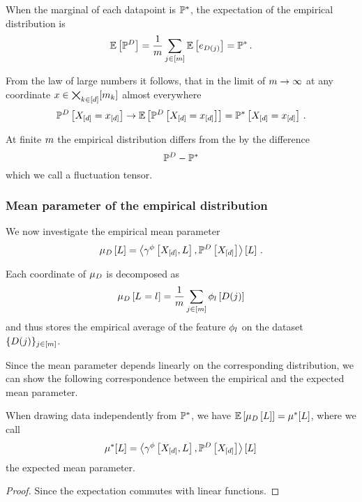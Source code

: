 When the marginal of each datapoint is $\mathbb{P}^*$, the expectation of the empirical distribution is
\begin{align*}
    \mathbb{E}\left[\mathbb{P}^{D}\right]
    = \frac{1}{m} \sum_{j\in[m]}  \mathbb{E}\left[e_{D(j)}\right]
    = \mathbb{P}^* \, .
\end{align*}

From the law of large numbers it follows, that in the limit of $m\rightarrow\infty$ at any coordinate $x\in\bigtimes_{k\in[d]}[m_{k}]$ almost everywhere
\[ \mathbb{P}^{D}\left[X_{[d]}=x_{[d]}\right] \rightarrow \mathbb{E}\left[\mathbb{P}^{D}\left[X_{[d]}=x_{[d]}\right]\right] =  \mathbb{P}^*\left[X_{[d]}=x_{[d]}\right] \, . \]

At finite $m$ the empirical distribution differs from the by the difference
\[ \mathbb{P}^{D} - \mathbb{P}^* \]
which we call a fluctuation tensor.

\subsubsection{Mean parameter of the empirical distribution}

We now investigate the empirical mean parameter
\[
    \mu_{D}\left[L\right] = \left\langle \gamma^{\phi}\left[X_{[d]},L\right],\mathbb{P}^{D}\left[X_{[d]}\right]\right\rangle \left[ L \right] \, .
\]

Each coordinate of $\mu_{D}$ is decomposed as
\[ \mu_{D}\left[L_{}=l_{}\right] = \frac{1}{m}\sum_{j\in[m]} \phi_{l}\left[D(j)\right] \]
and thus stores the empirical average of the feature $\phi_{l}$ on the dataset $\{D(j)\}_{j\in[m]}$.

Since the mean parameter depends linearly on the corresponding distribution, we can show the following correspondence between the empirical and the expected mean parameter.

\begin{theorem}
    \label{the:expectedMeanParameter}
    When drawing data independently from $\mathbb{P}^*$, we have $\mathbb{E}\left[\mu_{D}\left[L\right]\right]=\mu^*[L]$, where we call
    \[
        \mu^*[L] = \left\langle \gamma^{\phi}\left[X_{[d]},L\right],\mathbb{P}^{D}\left[X_{[d]}\right]\right\rangle \left[ L \right] \,
    \]
    the expected mean parameter.
\end{theorem}
\begin{proof}
    Since the expectation commutes with linear functions.
\end{proof}


